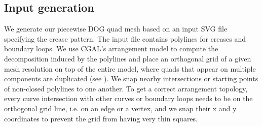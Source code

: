 \subsection{Input generation}
We generate our piecewise DOG quad mesh based on an input SVG file specifying the crease pattern. The input file contains polylines for creases and boundary loops. We use CGAL's arrangement model \cite{cgal} to compute the decomposition induced by the polylines and place an orthogonal grid of a given mesh resolution on top of the entire model, where quads that appear on multiple components are duplicated (see ). We snap nearby intersections or starting points of non-closed polylines to one another. To get a correct arrangement topology, every curve intersection with other curves or boundary loops needs to be on the orthogonal grid line, i.e. on an edge or a vertex, and we snap their x and y coordinates to prevent the grid from having very thin squares.